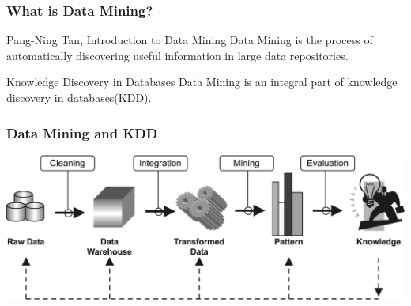 \documentclass[UTF8]{beamer}\usepackage[]{graphicx}\usepackage[]{color}
\begin{document}
\begin{frame}
  \frametitle{What is Data Mining?}

  \begin{block}{Pang-Ning Tan, Introduction to Data Mining}
Data Mining is the process of automatically discovering useful information in large data repositories.
  \end{block}

  \begin{block}{Knowledge Discovery in Databases}
Data Mining is an integral part of knowledge discovery in databases(KDD).
  \end{block}
\end{frame}

\begin{frame}
  \frametitle{Data Mining and KDD}
\centerline{\includegraphics[width=\textwidth]{dmkdd.png}}
\end{frame}
\end{document}

